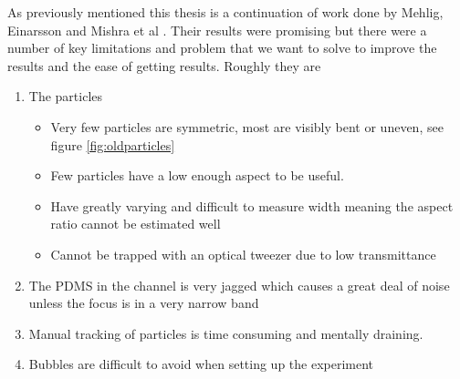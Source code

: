 As previously mentioned this thesis is a continuation of work done by Mehlig, Einarsson and Mishra et al \cite{AntonThesis, JonasExperiment, Mishra}. Their results were promising but there were a number of key limitations and problem that we want to solve to improve the results and the ease of getting results. Roughly they are
\begin{enumerate}
	\item The particles
	\begin{itemize}
		\item Very few particles are symmetric, most are visibly bent or uneven, see figure \ref{fig:oldparticles}
		\item Few particles have a low enough aspect to be useful.
		\item Have greatly varying and difficult to measure width meaning the aspect ratio cannot be estimated well
		\item Cannot be trapped with an optical tweezer due to low transmittance
	\end{itemize}
	\item The PDMS in the channel is very jagged which causes a great deal 
			of noise unless the focus is in a very narrow band
	\item Manual tracking of particles is time consuming and mentally draining.
	\item Bubbles are difficult to avoid when setting up the experiment
\end{enumerate}

